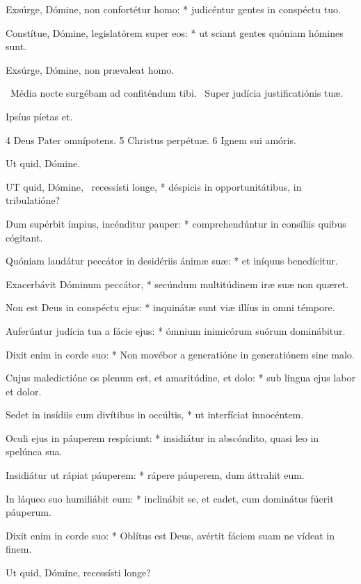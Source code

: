 Exsúrge, Dómine, non confortétur homo: * judicéntur gentes in conspéctu tuo.

Constítue, Dómine, legislatórem super eos: * ut sciant gentes quóniam hómines sunt.

 Exsúrge, Dómine, non prævaleat homo.

\V\ Média nocte surgébam ad confiténdum tibi. \R\ Super judícia justificatiónis tuæ.

 Ipsíus píetas et.

 4 Deus Pater omnípotens. 5 Christus perpétuæ. 6 Ignem sui amóris.


 Ut quid, Dómine. \textdagger


\lettrine[lines=2]{U}{T} quid, Dómine, \textdagger\ recessísti longe, * déspicis in opportunitátibus, in tribulatióne?

Dum supérbit ímpius, incénditur pauper: * comprehendúntur in consíliis quibus cógitant.

Quóniam laudátur peccátor in desidériis ánimæ suæ: * et iníquus benedícitur.

Exacerbávit Dóminum peccátor, * secúndum multitúdinem iræ suæ non quæret.

Non est Deus in conspéctu ejus: * inquinátæ sunt viæ illíus in omni témpore.

Auferúntur judícia tua a fácie ejus: * ómnium inimicórum suórum dominábitur.

Dixit enim in corde suo: * Non movébor a generatióne in generatiónem sine malo.

Cujus maledictióne os plenum est, et amaritúdine, et dolo: * sub lingua ejus labor et dolor.

Sedet in insídiis cum divítibus in occúltis, * ut interfíciat innocéntem.

Oculi ejus in páuperem respíciunt: * insidiátur in abscóndito, quasi leo in spelúnca sua.

Insidiátur ut rápiat páuperem: * rápere páuperem, dum áttrahit eum.

In láqueo suo humiliábit eum: * inclinábit se, et cadet, cum dominátus fúerit páuperum.

Dixit enim in corde suo: * Oblítus est Deus, avértit fáciem suam ne vídeat in finem.

 Ut quid, Dómine, recessísti longe?

